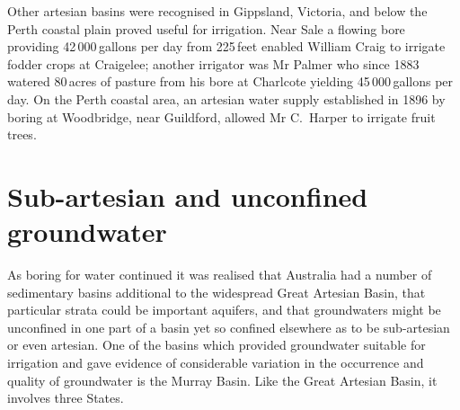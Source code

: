 Other artesian basins were recognised in Gippsland, Victoria,
 and below the Perth coastal plain proved
useful for irrigation. Near Sale  a flowing bore
providing 42\,000\,gallons per day from 225\,feet enabled William
Craig   to irrigate fodder crops at
Craigelee; another irrigator was Mr Palmer who since 1883 watered
80\,acres of pasture from his bore at Charlcote
yielding 45\,000\,gallons per day. On the Perth coastal area, an
artesian water supply established in 1896 by boring at Woodbridge,
 near Guildford, allowed Mr C.~Harper to
irrigate fruit trees.

\section*{Sub-artesian and unconfined\\
groundwater}

As boring for water continued it was realised that Australia had a
number of sedimentary basins additional to the widespread Great
Artesian Basin, that particular strata could be important aquifers,
and that groundwaters might be unconfined in one part of a basin yet
so confined elsewhere as to be sub-artesian or even artesian.  One of
the basins which provided groundwater suitable for irrigation and gave
evidence of considerable variation in the occurrence and quality of
groundwater is the Murray Basin.  Like the Great Artesian Basin, it
involves three States.

